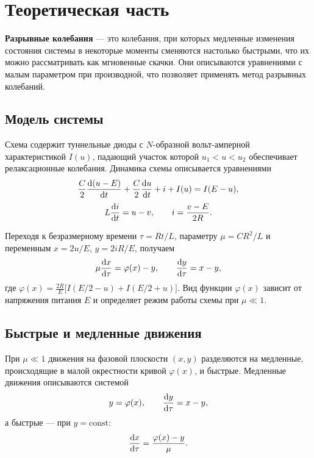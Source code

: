 \section{Теоретическая часть}

\textbf{Разрывные колебания} --- это колебания, при которых медленные изменения состояния системы в некоторые моменты сменяются настолько быстрыми, что их можно рассматривать как мгновенные скачки. Они описываются уравнениями с малым параметром при производной, что позволяет применять метод разрывных колебаний.

\subsection{Модель системы}

Схема содержит туннельные диоды с $N$-образной вольт-амперной характеристикой $I(u)$, падающий участок которой $u_1 < u < u_2$ обеспечивает релаксационные колебания. Динамика схемы описывается уравнениями
\begin{align} \label{eq:th:1}
	\frac{C}{2}\dv{(u-E)}{t} + \frac{C}{2}\dv{u}{t} + i + I(u) = I(E-u),
\end{align}
\begin{align} \label{eq:th:2}
	L\dv{i}{t} = u - v, \qquad i = \frac{v-E}{2R}.
\end{align}

Переходя к безразмерному времени $\tau = Rt/L$, параметру $\mu = CR^2/L$ и переменным $x = 2u/E$, $y = 2iR/E$, получаем
\begin{align} \label{eq:th:3}
	\mu\dv{x}{\tau} = \varphi(x) - y, \qquad \dv{y}{\tau} = x - y,
\end{align}
где $\varphi(x) = \frac{2R}{E}\big[I(E/2 - u) + I(E/2 + u)\big]$. Вид функции $\varphi(x)$ зависит от напряжения питания $E$ и определяет режим работы схемы при $\mu \ll 1$.

\subsection{Быстрые и медленные движения}

При $\mu \ll 1$ движения на фазовой плоскости $(x, y)$ разделяются на медленные, происходящие в малой окрестности кривой $\varphi(x)$, и быстрые. Медленные движения описываются системой
\begin{align} \label{eq:th:4}
	y = \varphi(x), \qquad \dv{y}{\tau} = x - y,
\end{align}
а быстрые --- при $y = \text{const}$:
\begin{align} \label{eq:th:5}
	\dv{x}{\tau} = \frac{\varphi(x) - y}{\mu}.
\end{align}

